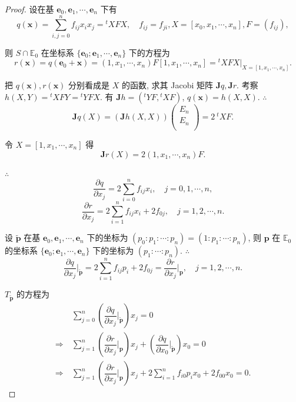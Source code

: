 \documentclass[color=black,device=normal,lang=cn,mode=geye]{elegantnote}
\begin{document}
\begin{proof}
    设在基 $\boldsymbol{e}_0,\boldsymbol{e}_1,\cdots,\boldsymbol{e}_n$ 下有
    \[q(\boldsymbol{x})=\sum\limits_{i,j=0}^nf_{ij}x_ix_j={}^tXFX,\quad f_{ij}=f_{ji},X=[x_0,x_1,\cdots,x_n],F=(f_{ij}),\]

    则 $S\cap\mathbb{E}_0$ 在坐标系 $\{\boldsymbol{e}_0;\boldsymbol{e}_1,\cdots,\boldsymbol{e}_n\}$ 下的方程为
    \[r(\boldsymbol{x})=q(\boldsymbol{e}_0+\boldsymbol{x})=(1,x_1,\cdots,x_n)F[1,x_1,\cdots,x_n]={}^tXFX\Big|_{X=[1,x_1,\cdots,x_n]}.\]

    把 $q(\boldsymbol{x}),r(\boldsymbol{x})$ 分别看成是 $X$ 的函数, 求其 Jacobi 矩阵 $\boldsymbol{J}q,\boldsymbol{J}r$. 考察 $h(X,Y)={}^tXFY={}^tYFX$. 有 $\boldsymbol{J}h=({}^tYF,{}^tXF)$, $q(\boldsymbol{x})=h(X,X)$. $\therefore$
    \[\boldsymbol{J}q(X)=(\boldsymbol{J}h(X,X))\begin{pmatrix}
        E_n \\
        E_n \\
    \end{pmatrix}=2\ {}^tXF.\]

    令 $X=[1,x_1,\cdots,x_n]$ 得
    \[\boldsymbol{J}r(X)=2(1,x_1,\cdots,x_n)F.\]

    $\therefore$
    \[\dfrac{\partial q}{\partial x_j}=2\sum\limits_{i=0}^nf_{ij}x_i,\quad j=0,1,\cdots,n,\]
    \[\dfrac{\partial r}{\partial x_j}=2\sum\limits_{i=1}^nf_{ij}x_i+2f_{0j},\quad j=1,2,\cdots,n.\]

    设 $\tilde{\boldsymbol{p}}$ 在基 $\boldsymbol{e}_0,\boldsymbol{e}_1,\cdots,\boldsymbol{e}_n$ 下的坐标为 $(p_0:p_1:\cdots:p_n)=(1:p_1:\cdots:p_n)$, 则 $\boldsymbol{p}$ 在 $\mathbb{E}_0$ 的坐标系 $\{\boldsymbol{e}_0;\boldsymbol{e}_1,\cdots,\boldsymbol{e}_n\}$ 下的坐标为 $(p_1:\cdots:p_n)$. $\therefore$
    \[\dfrac{\partial q}{\partial x_j}\bigg|_{\tilde{\boldsymbol{p}}}=2\sum\limits_{i=1}^nf_{ij}p_i+2f_{0j}=\dfrac{\partial r}{\partial x_j}\bigg|_{\boldsymbol{p}},\quad j=1,2,\cdots,n.\]
    
    $T_{\tilde{\boldsymbol{p}}}$ 的方程为
    \begin{align*}
        & \sum\limits_{j=0}^n\left(\dfrac{\partial q}{\partial x_j}\bigg|_{\tilde{\boldsymbol{p}}}\right)x_j=0 \\
        \Rightarrow\ & \sum\limits_{j=1}^n\left(\dfrac{\partial r}{\partial x_j}\bigg|_{\boldsymbol{p}}\right)x_j+\left(\dfrac{\partial q}{\partial x_0}\bigg|_{\tilde{\boldsymbol{p}}}\right)x_0=0 \\
        \Rightarrow\ & \sum\limits_{j=1}^n\left(\dfrac{\partial r}{\partial x_j}\bigg|_{\boldsymbol{p}}\right)x_j+2\sum\limits_{i=1}^nf_{i0}p_ix_0+2f_{00}x_0=0.
    \end{align*}


\end{proof}
\end{document}
